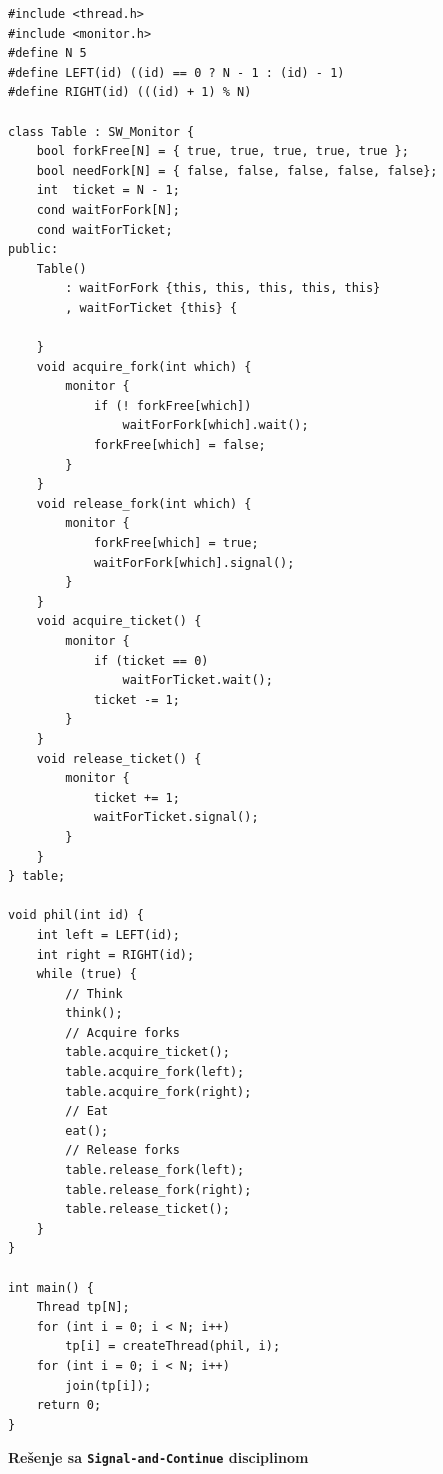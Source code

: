 \begin{lstlisting}
#include <thread.h>
#include <monitor.h>
#define N 5
#define LEFT(id) ((id) == 0 ? N - 1 : (id) - 1)
#define RIGHT(id) (((id) + 1) % N)

class Table : SW_Monitor {
    bool forkFree[N] = { true, true, true, true, true };
    bool needFork[N] = { false, false, false, false, false};
    int  ticket = N - 1;
    cond waitForFork[N];
    cond waitForTicket;
public:
    Table() 
        : waitForFork {this, this, this, this, this}
        , waitForTicket {this} {
        
    }
    void acquire_fork(int which) {
        monitor {
            if (! forkFree[which])
                waitForFork[which].wait();
            forkFree[which] = false;
        }
    }
    void release_fork(int which) {
        monitor {
            forkFree[which] = true;
            waitForFork[which].signal();
        }
    }
    void acquire_ticket() {
        monitor {
            if (ticket == 0)
                waitForTicket.wait();
            ticket -= 1;
        }
    }
    void release_ticket() {
        monitor {
            ticket += 1;
            waitForTicket.signal();
        }
    }
} table;

void phil(int id) {
    int left = LEFT(id);
    int right = RIGHT(id);
    while (true) {
        // Think
        think();
        // Acquire forks
        table.acquire_ticket();
        table.acquire_fork(left);
        table.acquire_fork(right);
        // Eat
        eat();
        // Release forks
        table.release_fork(left);
        table.release_fork(right);
        table.release_ticket();
    }
}

int main() {
    Thread tp[N];
    for (int i = 0; i < N; i++) 
        tp[i] = createThread(phil, i);
    for (int i = 0; i < N; i++) 
        join(tp[i]);
    return 0;
}

\end{lstlisting}
\textbf{Re\v{s}enje sa \texttt{Signal-and-Continue} disciplinom}
